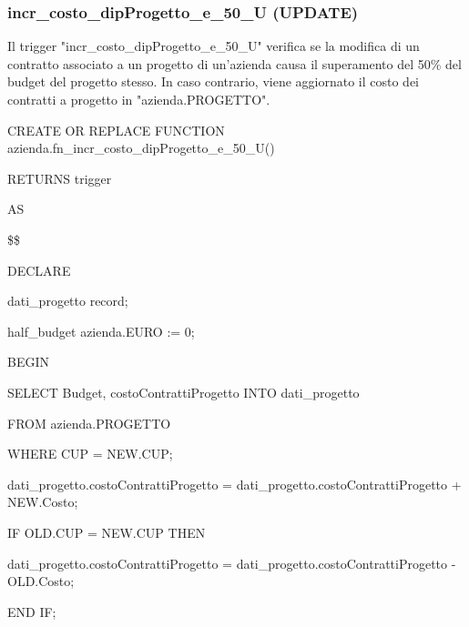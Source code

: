     \subsubsection{incr\_costo\_dipProgetto\_e\_50\_U (UPDATE)}
    Il trigger "incr\_costo\_dipProgetto\_e\_50\_U" verifica se la modifica di un contratto associato a un progetto di un'azienda causa il superamento del 50\% del budget del progetto stesso. In caso contrario, viene aggiornato il costo dei contratti a progetto in "azienda.PROGETTO".
    \ttfamily
        \begin{flushleft}
            \begin{description}
                \item CREATE OR REPLACE FUNCTION azienda.fn\_incr\_costo\_dipProgetto\_e\_50\_U()  
                \item RETURNS trigger
                \item AS
                \item \$\$
                \item DECLARE
                \begin{description}
                    \item dati\_progetto record;
                    \item half\_budget azienda.EURO := 0;
                \end{description}
                \item BEGIN 
                \begin{description}
                    \item SELECT Budget, costoContrattiProgetto INTO dati\_progetto
                    \item FROM azienda.PROGETTO
                    \item WHERE CUP = NEW.CUP;
                    
                    \vspace{0.5cm}

                    \item dati\_progetto.costoContrattiProgetto = dati\_progetto.costoContrattiProgetto + NEW.Costo;
                    \item IF OLD.CUP = NEW.CUP THEN
                    \begin{description}
                        \item dati\_progetto.costoContrattiProgetto = dati\_progetto.costoContrattiProgetto - OLD.Costo;
                    \end{description}
                    \item END IF;
                

\end{description}
\end{description}
\end{flushleft}
